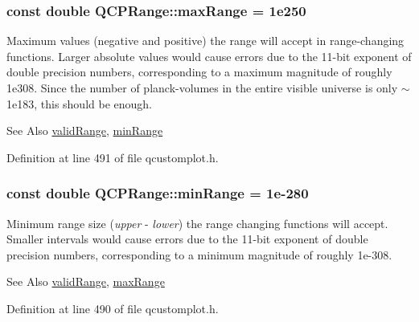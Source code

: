 \hypertarget{class_q_c_p_range_a5ca51e7a2dc5dc0d49527ab171fe1f4f}{
\subsubsection[{max\-Range}]{\setlength{\rightskip}{0pt plus 5cm}const double Q\-C\-P\-Range\-::max\-Range = 1e250\hspace{0.3cm}{\ttfamily [static]}}}\label{class_q_c_p_range_a5ca51e7a2dc5dc0d49527ab171fe1f4f}
Maximum values (negative and positive) the range will accept in range-\/changing functions. Larger absolute values would cause errors due to the 11-\/bit exponent of double precision numbers, corresponding to a maximum magnitude of roughly 1e308. Since the number of planck-\/volumes in the entire visible universe is only $\sim$1e183, this should be enough. \begin{DoxySeeAlso}{See Also}
\hyperlink{class_q_c_p_range_ab38bd4841c77c7bb86c9eea0f142dcc0}{valid\-Range}, \hyperlink{class_q_c_p_range_ab46d3bc95030ee25efda41b89e2b616b}{min\-Range} 
\end{DoxySeeAlso}


Definition at line 491 of file qcustomplot.\-h.

\hypertarget{class_q_c_p_range_ab46d3bc95030ee25efda41b89e2b616b}{
\subsubsection[{min\-Range}]{\setlength{\rightskip}{0pt plus 5cm}const double Q\-C\-P\-Range\-::min\-Range = 1e-\/280\hspace{0.3cm}{\ttfamily [static]}}}\label{class_q_c_p_range_ab46d3bc95030ee25efda41b89e2b616b}
Minimum range size ({\itshape upper} -\/ {\itshape lower}) the range changing functions will accept. Smaller intervals would cause errors due to the 11-\/bit exponent of double precision numbers, corresponding to a minimum magnitude of roughly 1e-\/308. \begin{DoxySeeAlso}{See Also}
\hyperlink{class_q_c_p_range_ab38bd4841c77c7bb86c9eea0f142dcc0}{valid\-Range}, \hyperlink{class_q_c_p_range_a5ca51e7a2dc5dc0d49527ab171fe1f4f}{max\-Range} 
\end{DoxySeeAlso}


Definition at line 490 of file qcustomplot.\-h.

